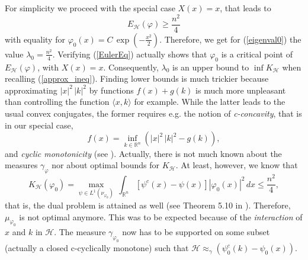 \documentclass[12pt,a4paper]{article}
\newcommand{\RR}[1]{\mathbb{R}^#1}
\newcommand{\HH}{\mathcal{H}}
\begin{document}
For simplicity we proceed with the special case $X(x)=x$, that leads to    
\begin{displaymath}
      E_{\HH}(\varphi) \geq \frac{n^2}{4}
\end{displaymath}
with equality for $\varphi_0(x)=C\,\exp(-\frac{x^2}{2})$. Therefore, we get
for (\ref{eigenval0}) the value $\lambda_0=\frac{n^2}{4}$. Verifying (\ref{EulerEq})
actually shows that $\varphi_0$ is a critical point of $E_\HH(\varphi)$, with
$X(x)=x$. Consequently, $\lambda_0$ is an upper bound to $\inf K_{\HH}$ when 
recalling (\ref{approx_ineq}). Finding lower bounds is much trickier because 
approximating $|x|^2\, |k|^2$ by functions $f(x)+g(k)$ is much more unpleasant
than controlling the function $\langle x,k\rangle$ for example. While the latter
leads to the usual convex conjugates, the former requires e.g. the notion of 
{\sl c-concavity}, that is in our special case,
\begin{displaymath}
   f(x) = \inf_{k\in{\RR n}} \left( |x|^2\, |k|^2 - g(k)\right),
\end{displaymath} 
and {\sl cyclic monotonicity} (see \cite{villani_topics_2003}). Actually,
there is not much known about the measures $\gamma_{\varphi}$ nor about
optimal bounds for $K_{\HH}$. At least, however, we know that
\begin{displaymath}
   K_{\HH}(\varphi_0)= {\operatorname{max}}_{\psi\in L^1(\nu_{\varphi_0})} \,
     \int_{\RR n} [\psi^c(x) - \psi(x)]|\varphi_0(x)|^2\,dx \leq \frac{n^2}{4},
\end{displaymath} 
that is, the dual problem is attained as well 
(see Theorem 5.10 in \cite{villani2008optimal}). Therefore, $\mu_{\varphi_0}$ 
is not optimal anymore. This was to be expected because of the {\sl interaction}
of $x$ and $k$ in $\HH$. The measure $\gamma_{\varphi_0}$ now has to be supported
on some subset (actually a closed c-cyclically monotone) such that 
$\HH \approx_\gamma (\psi_0^c(k)-\psi_0(x))$.
%
% 
\end{document}

